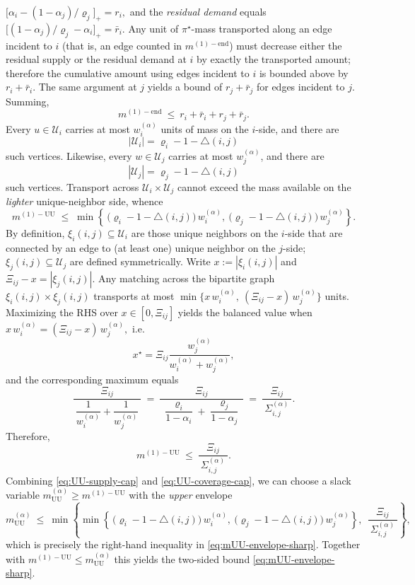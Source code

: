 \documentclass[twoside,11pt]{article}
\numberwithin{equation}{section}
\numberwithin{theorem}{section}
\numberwithin{example}{section}
\begin{document}
\(
\bigl[\alpha_i-(1-\alpha_j)/\varrho_j\bigr]_+ = r_i,
\)
and the \emph{residual demand} equals
\(
\bigl[(1-\alpha_j)/\varrho_j-\alpha_i\bigr]_+ = \bar r_i.
\)
Any unit of $\pi^\star$-mass transported along an edge incident to $i$ (that is, an edge counted in $m^{(1)-\mathrm{end}}$) must decrease either the residual supply or the residual demand at $i$ by exactly the transported amount; therefore the cumulative amount using edges incident to $i$ is bounded above by $r_i+\bar r_i$. The same argument at $j$ yields a bound of $r_j+\bar r_j$ for edges incident to $j$. Summing,
\begin{equation}
\label{eq:m1end-bound}
m^{(1)-\mathrm{end}}\ \le\ r_i+\bar r_i+r_j+\bar r_j.
\end{equation}
Every $u\in\mathcal U_i$ carries at most $w^{(\alpha)}_i$ units of mass on the $i$-side, and there are 
\[
|\mathcal U_i|=\varrho_i-1-\triangle(i,j)
\]
such vertices. Likewise, every $w\in\mathcal U_j$ carries at most $w^{(\alpha)}_j$, and there are 
\[
|\mathcal U_j|=\varrho_j-1-\triangle(i,j)
\]
such vertices. Transport across $\mathcal U_i\!\times\!\mathcal U_j$ cannot exceed the mass available on the \emph{lighter} unique-neighbor side, whence
\begin{equation}
\label{eq:UU-supply-cap}
m^{(1)-\mathrm{UU}}
\;\le\;
\min\left\{\,\bigl(\varrho_i-1-\triangle(i,j)\bigr)\,w^{(\alpha)}_i,\ \bigl(\varrho_j-1-\triangle(i,j)\bigr)\,w^{(\alpha)}_j \right\}.
\end{equation}
By definition, $\xi_i(i,j)\subseteq\mathcal U_i$ are those unique neighbors on the $i$-side that are connected by an edge to (at least one) unique neighbor on the $j$-side; $\xi_j(i,j)\subseteq\mathcal U_j$ are defined symmetrically.
Write 
\(
x:=|\xi_i(i,j)|
\)
and $\Xi_{ij}-x=|\xi_j(i,j)|$. Any matching across the bipartite graph $\xi_i(i,j)\times\xi_j(i,j)$ transports at most
\(
\min\{x\,w^{(\alpha)}_i,\ (\Xi_{ij}-x)\,w^{(\alpha)}_j\}
\)
units. Maximizing the RHS over $x\in[0,\Xi_{ij}]$ yields the balanced value when 
\(
x\,w^{(\alpha)}_i=(\Xi_{ij}-x)\,w^{(\alpha)}_j, 
\)
i.e. 
\[
x^\star=\Xi_{ij}\frac {w^{(\alpha)}_j}{w^{(\alpha)}_i+w^{(\alpha)}_j},
\]
and the corresponding maximum equals
\[
\frac{\Xi_{ij}}{\ \dfrac{1}{w^{(\alpha)}_i}+\dfrac{1}{w^{(\alpha)}_j}\ }\ 
=\ \frac{\Xi_{ij}}{\ \dfrac{\varrho_i}{1-\alpha_i}+\dfrac{\varrho_j}{1-\alpha_j}\ }\ 
=\ \frac{\Xi_{ij}}{\ \Sigma^{(\alpha)}_{i,j}\ }.
\]
Therefore,
\begin{equation}
\label{eq:UU-coverage-cap}
m^{(1)-\mathrm{UU}}\ \le\ \frac{\Xi_{ij}}{\ \Sigma^{(\alpha)}_{i,j}\ }.
\end{equation}
Combining \eqref{eq:UU-supply-cap} and \eqref{eq:UU-coverage-cap}, we can choose a slack variable $m^{(\alpha)}_{\mathrm{UU}}\ge m^{(1)-\mathrm{UU}}$ with the \emph{upper} envelope
\[
m^{(\alpha)}_{\mathrm{UU}}
\ \le\
\min\!\left\{
\min\left\{\,\bigl(\varrho_i-1-\triangle(i,j)\bigr)\,w^{(\alpha)}_i,\ \bigl(\varrho_j-1-\triangle(i,j)\bigr)\,w^{(\alpha)}_j \right\},\ \ \frac{\Xi_{ij}}{\ \Sigma^{(\alpha)}_{i,j}\ }
\right\},
\]
which is precisely the right-hand inequality in \eqref{eq:mUU-envelope-sharp}. Together with $m^{(1)-\mathrm{UU}}\le m^{(\alpha)}_{\mathrm{UU}}$ this yields the two-sided bound \eqref{eq:mUU-envelope-sharp}.
\end{document}
